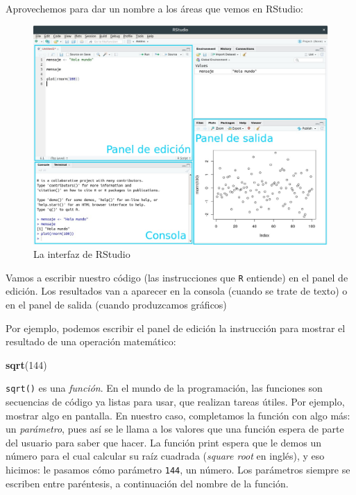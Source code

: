 \documentclass[]{book}
\newenvironment{Shaded}{\begin{snugshade}}{\end{snugshade}}
\newcommand{\KeywordTok}[1]{\textcolor[rgb]{0.13,0.29,0.53}{\textbf{#1}}}
\newcommand{\DecValTok}[1]{\textcolor[rgb]{0.00,0.00,0.81}{#1}}
\newcommand{\NormalTok}[1]{#1}
\begin{document}
Aprovechemos para dar un nombre a los áreas que vemos en RStudio:

\begin{figure}
\includegraphics[width=1\linewidth]{imagenes/Interfaz_RStudio} \caption{La interfaz de RStudio}\label{fig:unnamed-chunk-1}
\end{figure}

Vamos a escribir nuestro código (las instrucciones que \texttt{R}
entiende) en el panel de edición. Los resultados van a aparecer en la
consola (cuando se trate de texto) o en el panel de salida (cuando
produzcamos gráficos)

Por ejemplo, podemos escribir el panel de edición la instrucción para
mostrar el resultado de una operación matemático:

\begin{Shaded}
\begin{Highlighting}[]
\KeywordTok{sqrt}\NormalTok{(}\DecValTok{144}\NormalTok{)}
\end{Highlighting}
\end{Shaded}

\texttt{sqrt()} es una \emph{función}. En el mundo de la programación,
las funciones son secuencias de código ya listas para usar, que realizan
tareas útiles. Por ejemplo, mostrar algo en pantalla. En nuestro caso,
completamos la función con algo más: un \emph{parámetro}, pues así se le
llama a los valores que una función espera de parte del usuario para
saber que hacer. La función print espera que le demos un número para el
cual calcular su raíz cuadrada (\emph{square root} en inglés), y eso
hicimos: le pasamos cómo parámetro \texttt{144}, un número. Los
parámetros siempre se escriben entre paréntesis, a continuación del
nombre de la función.
\end{document}
